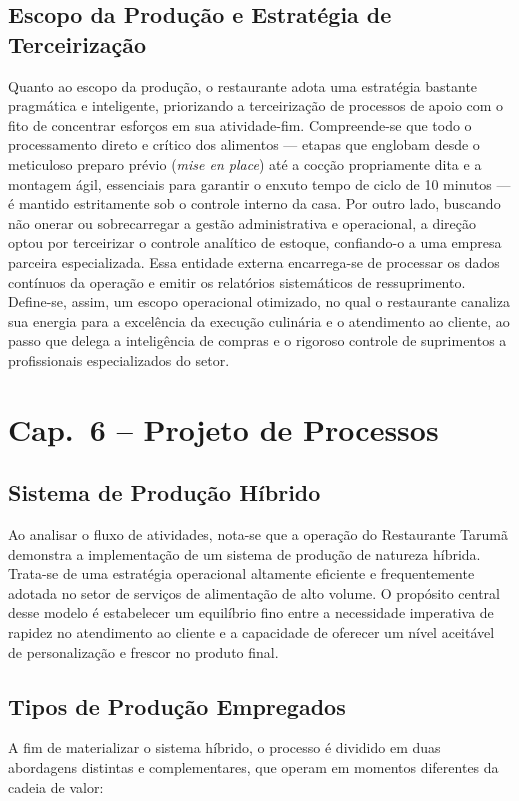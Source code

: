 \documentclass[12pt, a4paper]{article}
\begin{document}
\subsection{Escopo da Produção e Estratégia de Terceirização}
Quanto ao escopo da produção, o restaurante adota uma estratégia bastante pragmática e inteligente, priorizando a terceirização de processos de apoio com o fito de concentrar esforços em sua atividade-fim. Compreende-se que todo o processamento direto e crítico dos alimentos — etapas que englobam desde o meticuloso preparo prévio (\textit{mise en place}) até a cocção propriamente dita e a montagem ágil, essenciais para garantir o enxuto tempo de ciclo de 10 minutos — é mantido estritamente sob o controle interno da casa. Por outro lado, buscando não onerar ou sobrecarregar a gestão administrativa e operacional, a direção optou por terceirizar o controle analítico de estoque, confiando-o a uma empresa parceira especializada. Essa entidade externa encarrega-se de processar os dados contínuos da operação e emitir os relatórios sistemáticos de ressuprimento. Define-se, assim, um escopo operacional otimizado, no qual o restaurante canaliza sua energia para a excelência da execução culinária e o atendimento ao cliente, ao passo que delega a inteligência de compras e o rigoroso controle de suprimentos a profissionais especializados do setor.

\section{Cap.~6 – Projeto de Processos}

\subsection{Sistema de Produção Híbrido}
Ao analisar o fluxo de atividades, nota-se que a operação do Restaurante Tarumã demonstra a implementação de um sistema de produção de natureza híbrida. Trata-se de uma estratégia operacional altamente eficiente e frequentemente adotada no setor de serviços de alimentação de alto volume. O propósito central desse modelo é estabelecer um equilíbrio fino entre a necessidade imperativa de rapidez no atendimento ao cliente e a capacidade de oferecer um nível aceitável de personalização e frescor no produto final.

\subsection{Tipos de Produção Empregados}
A fim de materializar o sistema híbrido, o processo é dividido em duas abordagens distintas e complementares, que operam em momentos diferentes da cadeia de valor:
\end{document}
